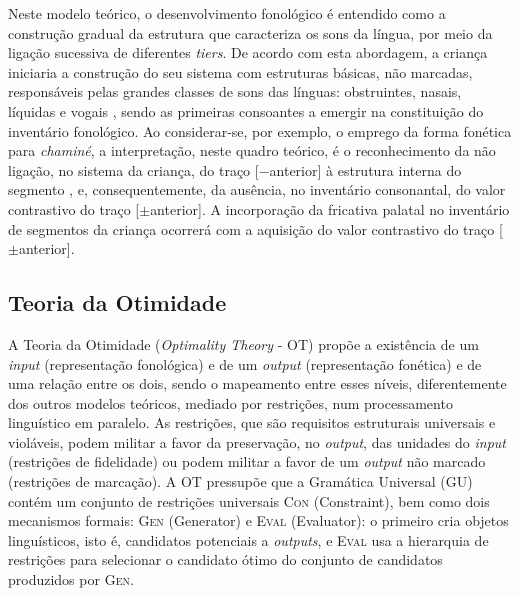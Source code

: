 \documentclass[output=paper]{LSP/langsci}
\begin{document}
Neste modelo teórico, o desenvolvimento fonológico é entendido como a construção gradual da estrutura que caracteriza os sons da língua, por meio da ligação sucessiva de diferentes \textit{tiers}. De acordo com esta abordagem, a criança iniciaria a construção do seu sistema com estruturas básicas, não marcadas, responsáveis pelas grandes classes de sons das línguas: obstruintes, nasais, líquidas e vogais \citep{matzenauer1996}, sendo  as primeiras consoantes a emergir na constituição do inventário fonológico. Ao considerar-se, por exemplo, o emprego da forma fonética \textipa{[s5mi\textprimstress nE]} para \textit{chaminé}, a interpretação, neste quadro teórico, é o reconhecimento da não ligação, no sistema da criança, do traço [$-$anterior] à estrutura interna do segmento , e, consequentemente, da ausência, no inventário consonantal, do valor contrastivo do traço [$\pm$anterior]. A incorporação da fricativa palatal no inventário de segmentos da criança ocorrerá com a aquisição do valor contrastivo do traço [$\pm$anterior].

\subsection{Teoria da Otimidade \citep{princesmolensky1993,mccarthyprince93}}
\label{subsec:matzenauer_ot}

A Teoria da Otimidade (\textit{Optimality Theory} - OT) propõe a existência de um \textit{input} (representação fonológica) e de um \textit{output} (representação fonética) e de uma relação entre os dois, sendo o mapeamento entre esses níveis, diferentemente dos outros modelos teóricos, mediado por restrições, num processamento linguístico em paralelo. As restrições, que são requisitos estruturais universais e violáveis, podem militar a favor da preservação, no \textit{output}, das unidades do \textit{input} (restrições de fidelidade) ou podem militar a favor de um \textit{output} não marcado (restrições de marcação). A OT pressupõe que a Gramática Universal (GU) contém um conjunto de restrições universais \textsc{Con} (Constraint), bem como dois mecanismos formais: \textsc{Gen} (Generator) e \textsc{Eval} (Evaluator): o primeiro cria objetos linguísticos, isto é, candidatos potenciais a \textit{outputs}, e \textsc{Eval} usa a hierarquia de restrições para selecionar o candidato ótimo do conjunto de candidatos produzidos por \textsc{Gen}.
\end{document}
